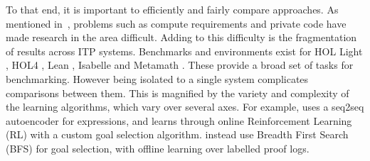 \documentclass[letterpaper]{article} %
\newcommand\alg[1]{\textsc{\sffamily{#1}}}%
\newcommand\system[1]{#1}
\begin{document}
    To that end, it is important to efficiently and fairly compare approaches.
    As mentioned in~\cite{yang_leandojo_2023},
    problems such as compute requirements and private code have made research in the area difficult.
    Adding to this difficulty is the fragmentation of results across ITP systems.
    Benchmarks and environments exist for \system{HOL Light} \cite{bansal_holist_2019, kaliszyk_holstep_2017}, \system{HOL4} \cite{wu_tacticzero_2021}, \system{Lean} \cite{polu_formal_2022, han_proof_2021, yang_leandojo_2023}, Isabelle \cite{li_isarstep_2020} and Metamath \cite{kaliszyk_mizar_2015}.
    These provide a broad set of tasks for benchmarking. However being isolated to a single system complicates comparisons between them.
    This is magnified by the variety and complexity of the learning algorithms, which vary over several axes.
    For example, \alg{TacticZero} \cite{wu_tacticzero_2021} uses a seq2seq autoencoder for expressions,
    and learns through online Reinforcement Learning (RL) with a custom goal selection algorithm.
    \cite{bansal_holist_2019} instead use Breadth First Search (BFS) for goal selection,
    with offline learning over labelled proof logs.
\end{document}

